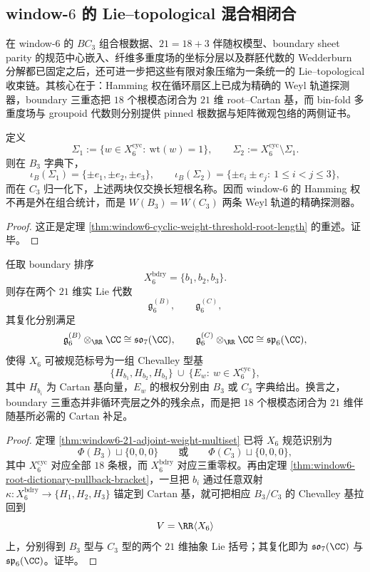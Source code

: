 \subsection{window-\texorpdfstring{$6$}{6} 的 Lie--topological 混合相闭合}\label{subsec:conclusion-window6-lie-topological-hybrid-phase}
在 window-\(6\) 的 \(BC_3\) 组合根数据、\(21=18+3\) 伴随权模型、boundary sheet parity 的规范中心嵌入、纤维多重度场的坐标分层以及群胚代数的 Wedderburn 分解都已固定之后，还可进一步把这些有限对象压缩为一条统一的 Lie--topological 收束链。其核心在于：Hamming 权在循环扇区上已成为精确的 Weyl 轨道探测器，boundary 三重态把 \(18\) 个根模态闭合为 \(21\) 维 root--Cartan 基，而 bin-fold 多重度场与 groupoid 代数则分别提供 pinned 根数据与矩阵微观包络的两侧证书。

\begin{corollary}\label{cor:conclusion-window6-hamming-weyl-orbit-detector}
定义
\[
\Sigma_1:=\{w\in X_6^{\mathrm{cyc}}:\ \mathrm{wt}(w)=1\},
\qquad
\Sigma_2:=X_6^{\mathrm{cyc}}\setminus \Sigma_1.
\]
则在 \(B_3\) 字典下，
\[
\iota_B(\Sigma_1)=\{\pm e_1,\pm e_2,\pm e_3\},
\qquad
\iota_B(\Sigma_2)=\{\pm e_i\pm e_j:\ 1\le i<j\le 3\},
\]
而在 \(C_3\) 归一化下，上述两块仅交换长短根名称。因而 window-\(6\) 的 Hamming 权不再是外在组合统计，而是 \(W(B_3)=W(C_3)\) 两条 Weyl 轨道的精确探测器。
\end{corollary}
\begin{proof}
这正是定理 \ref{thm:window6-cyclic-weight-threshold-root-length} 的重述。证毕。
\end{proof}

\begin{theorem}\label{thm:conclusion-window6-abstract-chevalley-completion}
任取 boundary 排序
\[
X_6^{\mathrm{bdry}}=\{b_1,b_2,b_3\}.
\]
则存在两个 \(21\) 维实 Lie 代数
\[
\mathfrak g_6^{(B)},\qquad \mathfrak g_6^{(C)},
\]
其复化分别满足
\[
\mathfrak g_6^{(B)}\otimes_{\RR}\CC\cong \mathfrak{so}_7(\CC),
\qquad
\mathfrak g_6^{(C)}\otimes_{\RR}\CC\cong \mathfrak{sp}_6(\CC),
\]
使得 \(X_6\) 可被规范标号为一组 Chevalley 型基
\[
\{H_{b_1},H_{b_2},H_{b_3}\}\ \cup\ \{E_w:\ w\in X_6^{\mathrm{cyc}}\},
\]
其中 \(H_{b_i}\) 为 Cartan 基向量，\(E_w\) 的根权分别由 \(B_3\) 或 \(C_3\) 字典给出。换言之，boundary 三重态并非循环壳层之外的残余点，而是把 \(18\) 个根模态闭合为 \(21\) 维伴随基所必需的 Cartan 补足。
\end{theorem}
\begin{proof}
定理 \ref{thm:window6-21-adjoint-weight-multiset} 已将 \(X_6\) 规范识别为
\[
\Phi(B_3)\sqcup\{0,0,0\}
\qquad\text{或}\qquad
\Phi(C_3)\sqcup\{0,0,0\},
\]
其中 \(X_6^{\mathrm{cyc}}\) 对应全部 \(18\) 条根，而 \(X_6^{\mathrm{bdry}}\) 对应三重零权。再由定理 \ref{thm:window6-root-dictionary-pullback-bracket}，一旦把 \(b_i\) 通过任意双射 \(\kappa:X_6^{\mathrm{bdry}}\to\{H_1,H_2,H_3\}\) 锚定到 Cartan 基，就可把相应 \(B_3/C_3\) 的 Chevalley 基拉回到
\[
V=\RR\langle X_6\rangle
\]
上，分别得到 \(B_3\) 型与 \(C_3\) 型的两个 \(21\) 维抽象 Lie 括号；其复化即为 \(\mathfrak{so}_7(\CC)\) 与 \(\mathfrak{sp}_6(\CC)\)。证毕。
\end{proof}

